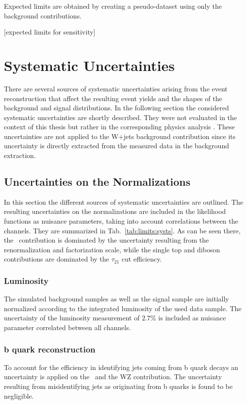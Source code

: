 \noindent Expected limits are obtained by creating a pseudo-dataset using only the background contributions.


[expected limits for sensitivity]

\section{Systematic Uncertainties}
\label{sec:systematics}
There are several sources of systematic uncertainties arising from the event reconstruction that affect the resulting event yields and the shapes of the background and signal distributions. In the following section the considered systematic uncertainties are shortly described. They were not evaluated in the context of this thesis but rather in the corresponding physics analysis \cite{PAS}. These uncertainties are not applied to the W+jets background contribution since its uncertainty is directly extracted from the measured data in the background extraction.

\subsection*{Uncertainties on the Normalizations}
In this section the different sources  of systematic uncertainties are outlined. The resulting uncertainties on the normalizations are included in the likelihood functions as nuisance parameters, taking into account correlations between the channels. They are summarized in Tab.~\ref{tab:limits:systs}. As can be seen there, the \ttbar \ contribution is dominated by the uncertainty resulting from the renormalization and factorization scale, while the single top and diboson contributions are dominated by the $\tau_{21}$ cut efficiency.
\subsubsection*{Luminosity}
The simulated background samples as well as the signal sample are initially normalized according to the integrated luminosity of the used data sample. The uncertainty of the luminosity measurement of $2.7$\% is included as nuisance parameter correlated between all channels.
\subsubsection*{b quark reconstruction}
To account for the efficiency in identifying jets coming from b quark decays \cite{CSV2} an uncertainty is applied on the \ttbar \ and the WZ contribution. The uncertainty resulting from misidentifying jets as originating from b quarks is found to be negligible.
